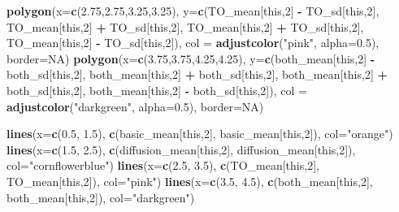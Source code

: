 \documentclass[]{book}
\newenvironment{Shaded}{\begin{snugshade}}{\end{snugshade}}
\newcommand{\KeywordTok}[1]{\textcolor[rgb]{0.13,0.29,0.53}{\textbf{{#1}}}}
\newcommand{\DataTypeTok}[1]{\textcolor[rgb]{0.13,0.29,0.53}{{#1}}}
\newcommand{\DecValTok}[1]{\textcolor[rgb]{0.00,0.00,0.81}{{#1}}}
\newcommand{\FloatTok}[1]{\textcolor[rgb]{0.00,0.00,0.81}{{#1}}}
\newcommand{\StringTok}[1]{\textcolor[rgb]{0.31,0.60,0.02}{{#1}}}
\newcommand{\OtherTok}[1]{\textcolor[rgb]{0.56,0.35,0.01}{{#1}}}
\newcommand{\OperatorTok}[1]{\textcolor[rgb]{0.81,0.36,0.00}{\textbf{{#1}}}}
\newcommand{\NormalTok}[1]{{#1}}
\theoremstyle{definition}
\theoremstyle{definition}
\theoremstyle{definition}
\theoremstyle{remark}
\begin{document}
\begin{Shaded}
\begin{Highlighting}[]
\KeywordTok{polygon}\NormalTok{(}\DataTypeTok{x=}\KeywordTok{c}\NormalTok{(}\FloatTok{2.75}\NormalTok{,}\FloatTok{2.75}\NormalTok{,}\FloatTok{3.25}\NormalTok{,}\FloatTok{3.25}\NormalTok{), }\DataTypeTok{y=}\KeywordTok{c}\NormalTok{(TO_mean[this,}\DecValTok{2}\NormalTok{] }\OperatorTok{-}\StringTok{ }\NormalTok{TO_sd[this,}\DecValTok{2}\NormalTok{], TO_mean[this,}\DecValTok{2}\NormalTok{] }\OperatorTok{+}\StringTok{ }\NormalTok{TO_sd[this,}\DecValTok{2}\NormalTok{], TO_mean[this,}\DecValTok{2}\NormalTok{] }\OperatorTok{+}\StringTok{ }\NormalTok{TO_sd[this,}\DecValTok{2}\NormalTok{], TO_mean[this,}\DecValTok{2}\NormalTok{] }\OperatorTok{-}\StringTok{ }\NormalTok{TO_sd[this,}\DecValTok{2}\NormalTok{]), }\DataTypeTok{col =} \KeywordTok{adjustcolor}\NormalTok{(}\StringTok{"pink"}\NormalTok{, }\DataTypeTok{alpha=}\FloatTok{0.5}\NormalTok{), }\DataTypeTok{border=}\OtherTok{NA}\NormalTok{)}
\KeywordTok{polygon}\NormalTok{(}\DataTypeTok{x=}\KeywordTok{c}\NormalTok{(}\FloatTok{3.75}\NormalTok{,}\FloatTok{3.75}\NormalTok{,}\FloatTok{4.25}\NormalTok{,}\FloatTok{4.25}\NormalTok{), }\DataTypeTok{y=}\KeywordTok{c}\NormalTok{(both_mean[this,}\DecValTok{2}\NormalTok{] }\OperatorTok{-}\StringTok{ }\NormalTok{both_sd[this,}\DecValTok{2}\NormalTok{], both_mean[this,}\DecValTok{2}\NormalTok{] }\OperatorTok{+}\StringTok{ }\NormalTok{both_sd[this,}\DecValTok{2}\NormalTok{], both_mean[this,}\DecValTok{2}\NormalTok{] }\OperatorTok{+}\StringTok{ }\NormalTok{both_sd[this,}\DecValTok{2}\NormalTok{], both_mean[this,}\DecValTok{2}\NormalTok{] }\OperatorTok{-}\StringTok{ }\NormalTok{both_sd[this,}\DecValTok{2}\NormalTok{]), }\DataTypeTok{col =} \KeywordTok{adjustcolor}\NormalTok{(}\StringTok{"darkgreen"}\NormalTok{, }\DataTypeTok{alpha=}\FloatTok{0.5}\NormalTok{), }\DataTypeTok{border=}\OtherTok{NA}\NormalTok{)}


\KeywordTok{lines}\NormalTok{(}\DataTypeTok{x=}\KeywordTok{c}\NormalTok{(}\FloatTok{0.5}\NormalTok{, }\FloatTok{1.5}\NormalTok{), }\KeywordTok{c}\NormalTok{(basic_mean[this,}\DecValTok{2}\NormalTok{], basic_mean[this,}\DecValTok{2}\NormalTok{]),  }\DataTypeTok{col=}\StringTok{"orange"}\NormalTok{)}
\KeywordTok{lines}\NormalTok{(}\DataTypeTok{x=}\KeywordTok{c}\NormalTok{(}\FloatTok{1.5}\NormalTok{, }\FloatTok{2.5}\NormalTok{), }\KeywordTok{c}\NormalTok{(diffusion_mean[this,}\DecValTok{2}\NormalTok{], diffusion_mean[this,}\DecValTok{2}\NormalTok{]),  }\DataTypeTok{col=}\StringTok{"cornflowerblue"}\NormalTok{)}
\KeywordTok{lines}\NormalTok{(}\DataTypeTok{x=}\KeywordTok{c}\NormalTok{(}\FloatTok{2.5}\NormalTok{, }\FloatTok{3.5}\NormalTok{), }\KeywordTok{c}\NormalTok{(TO_mean[this,}\DecValTok{2}\NormalTok{], TO_mean[this,}\DecValTok{2}\NormalTok{]),  }\DataTypeTok{col=}\StringTok{"pink"}\NormalTok{)}
\KeywordTok{lines}\NormalTok{(}\DataTypeTok{x=}\KeywordTok{c}\NormalTok{(}\FloatTok{3.5}\NormalTok{, }\FloatTok{4.5}\NormalTok{), }\KeywordTok{c}\NormalTok{(both_mean[this,}\DecValTok{2}\NormalTok{], both_mean[this,}\DecValTok{2}\NormalTok{]),  }\DataTypeTok{col=}\StringTok{"darkgreen"}\NormalTok{)}


\end{Highlighting}
\end{Shaded}
\end{document}
